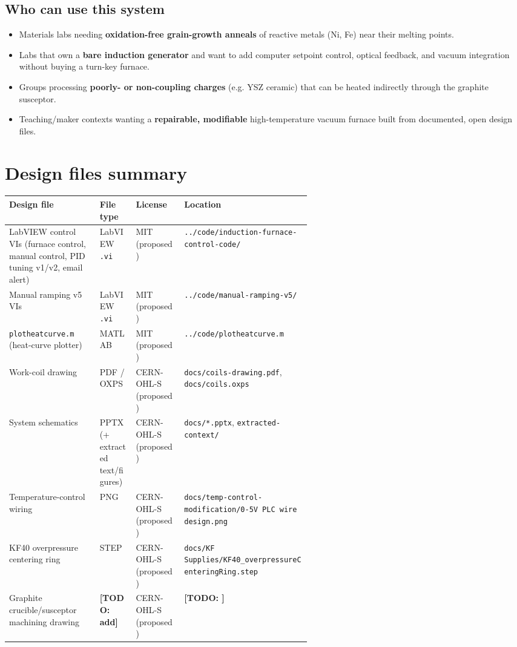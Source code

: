 \documentclass[5p,times]{elsarticle}
\newcommand{\todo}[1]{{\color{red}\textbf{[TODO: #1]}}}
\begin{document}
\subsection{Who can use this system}

\begin{itemize}[nosep]
\item Materials labs needing \textbf{oxidation-free grain-growth anneals} of reactive metals (Ni, Fe) near their melting points.
\item Labs that own a \textbf{bare induction generator} and want to add computer setpoint control, optical feedback, and vacuum integration without buying a turn-key furnace.
\item Groups processing \textbf{poorly- or non-coupling charges} (e.g. YSZ ceramic) that can be heated indirectly through the graphite susceptor.
\item Teaching/maker contexts wanting a \textbf{repairable, modifiable} high-temperature vacuum furnace built from documented, open design files.
\end{itemize}

\section{Design files summary}

\begin{table}[ht]
\small
\begin{tabularx}{\linewidth}{L{0.30\linewidth} L{0.12\linewidth} L{0.16\linewidth} X}
\toprule
\textbf{Design file} & \textbf{File type} & \textbf{License} & \textbf{Location} \\
\midrule
LabVIEW control VIs (furnace control, manual control, PID tuning v1/v2, email alert) & LabVIEW \texttt{.vi} & MIT (proposed) & \texttt{../code/induction-furnace-control-code/} \\
Manual ramping v5 VIs & LabVIEW \texttt{.vi} & MIT (proposed) & \texttt{../code/manual-ramping-v5/} \\
\texttt{plotheatcurve.m} (heat-curve plotter) & MATLAB & MIT (proposed) & \texttt{../code/plotheatcurve.m} \\
Work-coil drawing & PDF / OXPS & CERN-OHL-S (proposed) & \texttt{docs/coils-drawing.pdf}, \texttt{docs/coils.oxps} \\
System schematics & PPTX (+ extracted text/figures) & CERN-OHL-S (proposed) & \texttt{docs/*.pptx}, \texttt{extracted-context/} \\
Temperature-control wiring & PNG & CERN-OHL-S (proposed) & \texttt{docs/temp-control-modification/0-5V PLC wire design.png} \\
KF40 overpressure centering ring & STEP & CERN-OHL-S (proposed) & \texttt{docs/KF Supplies/KF40\_overpressureCenteringRing.step} \\
Graphite crucible/susceptor machining drawing & \todo{add} & CERN-OHL-S (proposed) & \todo{} \\
\bottomrule
\end{tabularx}
\end{table}
\end{document}
